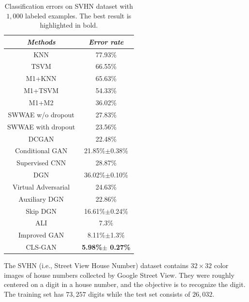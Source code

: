 \begin{table}[t]
\caption{Classification errors on SVHN dataset with $1,000$ labeled examples. The best result is highlighted in bold.}
\label{tab:svhn}
\begin{center}
\begin{tabular}{c||c}    \toprule
\emph{Methods} & \emph{Error rate} \\\midrule
KNN \cite{radford2015unsupervised}& 77.93\%\\
TSVM \cite{radford2015unsupervised}& 66.55\%\\
M1+KNN \cite{kingma2014semi}& 65.63\%\\
M1+TSVM \cite{kingma2014semi}& 54.33\%\\
M1+M2 \cite{kingma2014semi}& 36.02\%\\\midrule
SWWAE w/o dropout \cite{zhao2015stacked}& 27.83\%\\
SWWAE with dropout \cite{zhao2015stacked}& 23.56\%\\
DCGAN \cite{radford2015unsupervised}& 22.48\%\\
Conditional GAN \cite{mirza2014conditional}& 21.85\%$\pm$0.38\%\\
Supervised CNN \cite{radford2015unsupervised}& 28.87\%\\
DGN \cite{kingma2014semi} &36.02\%$\pm$0.10\%\\
Virtual Adversarial \cite{miyato2015distributional} &24.63\%\\
Auxiliary DGN \cite{maaloe2016auxiliary} &22.86\%\\
Skip DGN \cite{maaloe2016auxiliary}&16.61\%$\pm$0.24\%\\
ALI \cite{dumoulin2016adversarially} & 7.3\%\\
Improved GAN \cite{salimans2016improved}&8.11\%$\pm$1.3\%\\\midrule
CLS-GAN & {\bf 5.98\%$\pm$ 0.27\%}\\\bottomrule
\end{tabular}
\vspace{-2mm}
\end{center}
\end{table}

The SVHN (i.e., Street View House Number) dataset \cite{netzer2011reading} contains $32\times 32$ color images of house numbers collected by Google Street View. They were roughly centered on a digit in a house number, and the objective is to recognize the digit.  The training set has $73,257$ digits while the test set consists of $26,032$.

